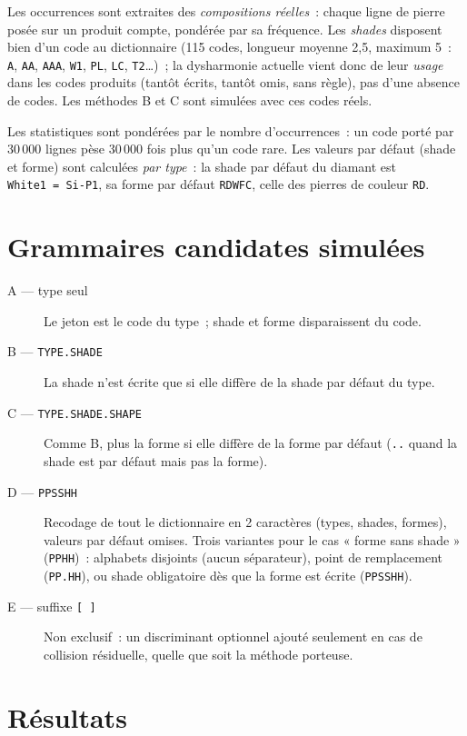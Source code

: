 \documentclass[11pt,a4paper]{article}
\newcommand{\code}[1]{\texttt{#1}}
\begin{document}
\noindent Les occurrences sont extraites des \emph{compositions r\'eelles}~:
chaque ligne de pierre pos\'ee sur un produit compte, pond\'er\'ee par sa
fr\'equence. Les \emph{shades} disposent bien d'un code au dictionnaire
(115 codes, longueur moyenne 2,5, maximum 5~: \code{A}, \code{AA},
\code{AAA}, \code{W1}, \code{PL}, \code{LC}, \code{T2}\ldots)~; la
dysharmonie actuelle vient donc de leur \emph{usage} dans les codes
produits (tant\^ot \'ecrits, tant\^ot omis, sans r\`egle), pas d'une absence
de codes. Les m\'ethodes B et C sont simul\'ees avec ces codes r\'eels.

Les statistiques sont pondérées par le nombre d'occurrences~: un code porté
par 30\,000 lignes pèse 30\,000 fois plus qu'un code rare. Les valeurs par
défaut (shade et forme) sont calculées \emph{par type}~: la shade par défaut
du diamant est \code{White1~=~Si-P1}, sa forme par défaut \code{RDWFC},
celle des pierres de couleur \code{RD}.

\section{Grammaires candidates simulées}

\begin{description}
\item[A — type seul] Le jeton est le code du type~; shade et forme
  disparaissent du code.
\item[B — \code{TYPE.SHADE}] La shade n'est écrite que si elle diffère de la
  shade par défaut du type.
\item[C — \code{TYPE.SHADE.SHAPE}] Comme B, plus la forme si elle diffère de
  la forme par défaut (\code{..} quand la shade est par défaut mais pas la
  forme).
\item[D — \code{PPSSHH}] Recodage de tout le dictionnaire en 2 caractères
  (types, shades, formes), valeurs par défaut omises. Trois variantes pour
  le cas « forme sans shade » (\code{PPHH})~: alphabets disjoints
  (aucun séparateur), point de remplacement (\code{PP.HH}), ou shade
  obligatoire dès que la forme est écrite (\code{PPSSHH}).
\item[E — suffixe \code{[\,]}] Non exclusif~: un discriminant optionnel
  ajouté seulement en cas de collision résiduelle, quelle que soit la
  méthode porteuse.
\end{description}

\section{Résultats}
\end{document}
